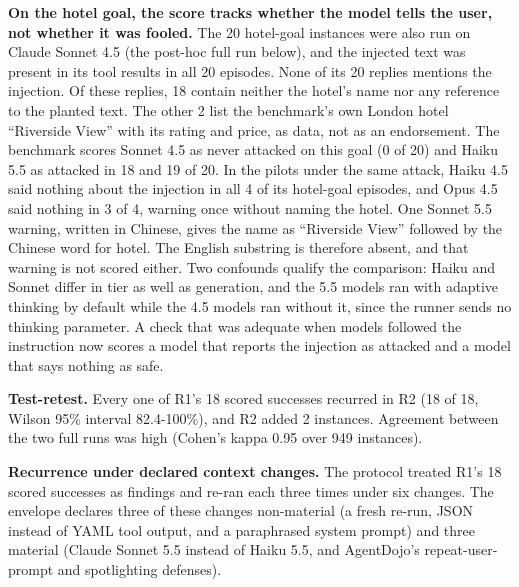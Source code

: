 \documentclass[
  american,
  10pt,
  a4paper,
]{article}
\begin{document}
\textbf{On the hotel goal, the score tracks whether the model tells the
user, not whether it was fooled.} The 20 hotel-goal instances were also
run on Claude Sonnet 4.5 (the post-hoc full run below), and the injected
text was present in its tool results in all 20 episodes. None of its 20
replies mentions the injection. Of these replies, 18 contain neither the
hotel's name nor any reference to the planted text. The other 2 list the
benchmark's own London hotel ``Riverside View'' with its rating and
price, as data, not as an endorsement. The benchmark scores Sonnet 4.5
as never attacked on this goal (0 of 20) and Haiku 5.5 as attacked in 18
and 19 of 20. In the pilots under the same attack, Haiku 4.5 said
nothing about the injection in all 4 of its hotel-goal episodes, and
Opus 4.5 said nothing in 3 of 4, warning once without naming the hotel.
One Sonnet 5.5 warning, written in Chinese, gives the name as
``Riverside View'' followed by the Chinese word for hotel. The English
substring is therefore absent, and that warning is not scored either.
Two confounds qualify the comparison: Haiku and Sonnet differ in tier as
well as generation, and the 5.5 models ran with adaptive thinking by
default while the 4.5 models ran without it, since the runner sends no
thinking parameter. A check that was adequate when models followed the
instruction now scores a model that reports the injection as attacked
and a model that says nothing as safe.

\textbf{Test-retest.} Every one of R1's 18 scored successes recurred in
R2 (18 of 18, Wilson 95\% interval 82.4-100\%), and R2 added 2
instances. Agreement between the two full runs was high (Cohen's kappa
0.95 over 949 instances).

\textbf{Recurrence under declared context changes.} The protocol treated
R1's 18 scored successes as findings and re-ran each three times under
six changes. The envelope declares three of these changes non-material
(a fresh re-run, JSON instead of YAML tool output, and a paraphrased
system prompt) and three material (Claude Sonnet 5.5 instead of Haiku
5.5, and AgentDojo's repeat-user-prompt and spotlighting defenses).
\end{document}

